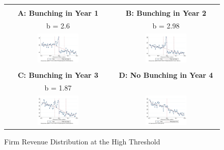 \begin{figure}[t]
\caption{Firm Revenue Distribution at the High Threshold}

\label{fig:HighestThreshold} 
\begin{centering}
\begin{tabular}{cc}
\vspace{0.2cm}
  & \vspace{0.2cm}
 \tabularnewline
\textbf{A: Bunching in Year 1}  & \textbf{B: Bunching in Year 2}\tabularnewline
b = 2.6  & b = 2.98\tabularnewline
\includegraphics[width=0.4\textwidth]{graphs/BunchingYear1_50Million_Degree4_3lac}  & \includegraphics[width=0.4\textwidth]{graphs/BunchingYear2_50Million_Degree4_3lac}\tabularnewline
\vspace{0.2cm}
  & \vspace{0.2cm}
 \tabularnewline
\textbf{C: Bunching in Year 3}  & \textbf{D: No Bunching in Year 4}\tabularnewline
b = 1.87  & \tabularnewline
\includegraphics[width=0.4\textwidth]{graphs/BunchingYear3_50Million_Degree4_3lac}  & \includegraphics[width=0.4\textwidth]{graphs/BunchingYear4_50Million_Degree4_3lac}\tabularnewline

\end{tabular}
\end{centering}
\end{figure}
